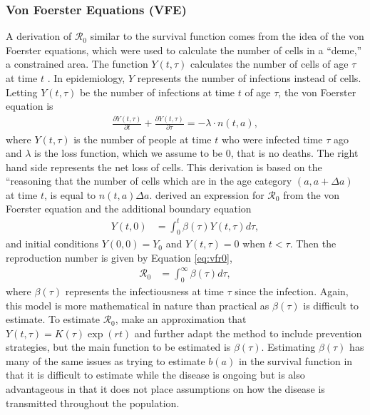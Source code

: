 \documentclass[12pt]{article}
\newcommand{\rr}{\ensuremath{\mathcal{R}_0}}
\begin{document}

\subsubsection{Von Foerster Equations (VFE)}
\label{sec:direct-estim-surv}

A derivation of $\rr$ similar to the survival function comes from the idea of the von Foerster equations, which were used to calculate the number of cells in a ``deme,'' a constrained area.  The function $Y(t, \tau)$ calculates the number of cells of age $\tau$ at time $t$ \citep{trucco1965}.  In epidemiology, $Y$ represents the number of infections instead of cells. Letting $Y(t, \tau)$ be the number of infections at time $t$ of age $\tau$, the von Foerster equation is
\begin{align*}
  \frac{\partial Y(t, \tau)}{\partial t} +   \frac{\partial Y(t, \tau)}{\partial \tau} = -  \lambda \cdot n(t, a) ,
\end{align*}
where $Y(t,\tau)$ is the number of people at time $t$ who were infected time $\tau$ ago and $\lambda$ is the loss function, which we assume to be 0, that is no deaths.  The right hand side represents the net loss of cells.  This derivation is based on the ``reasoning that the number of cells which are in the age category $(a, a + \Delta a)$ at time $t$, is equal to $n(t,a) \Delta a$.     \cite{fraser2004factors} derived an expression for $\rr$ from the von Foerster equation and the additional boundary equation
\begin{align*}
  Y(t,0) &= \int_0^t \beta( \tau) Y(t, \tau) d \tau,
\end{align*}
and initial conditions $Y(0,0) = Y_0$ and $Y(t, \tau) = 0$ when $t < \tau$.  Then the reproduction number is given by Equation \ref{eq:vfr0},
\begin{align}\label{eq:vfr0}
\rr &= \int_0^\infty \beta(\tau) d\tau,
\end{align}
 where $\beta (\tau)$ represents the infectiousness at time $\tau$ since the infection.    Again, this model is more mathematical in nature than practical as $\beta (\tau)$ is difficult to estimate.  To estimate $\rr$, \cite{fraser2004factors} make an approximation that $Y(t, \tau) = K(\tau) \exp (rt)$ and further adapt the method to include prevention strategies, but the main function to be estimated is $\beta (\tau)$.  Estimating $\beta (\tau)$ has many of the same issues as trying to estimate $b(a)$ in the survival function in that it is difficult to estimate while the disease is ongoing but is also advantageous in that it does not place assumptions on how the disease is transmitted throughout the population.
\end{document}

